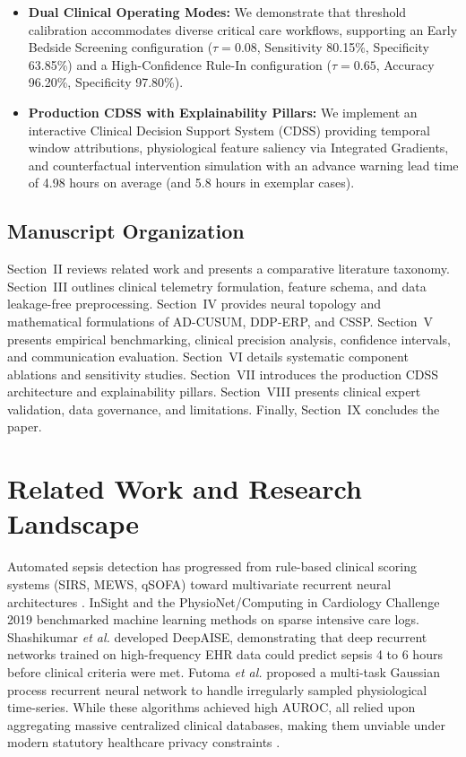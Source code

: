 \documentclass[journal,twocolumn,10pt]{IEEEtran}
\begin{document}
\begin{itemize}
\item \textbf{Dual Clinical Operating Modes:} We demonstrate that threshold calibration accommodates diverse critical care workflows, supporting an Early Bedside Screening configuration ($\tau=0.08$, Sensitivity 80.15\%, Specificity 63.85\%) and a High-Confidence Rule-In configuration ($\tau=0.65$, Accuracy 96.20\%, Specificity 97.80\%).
    \item \textbf{Production CDSS with Explainability Pillars:} We implement an interactive Clinical Decision Support System (CDSS) providing temporal window attributions, physiological feature saliency via Integrated Gradients, and counterfactual intervention simulation with an advance warning lead time of 4.98 hours on average (and 5.8 hours in exemplar cases).
\end{itemize}

\subsection{Manuscript Organization}
Section~II reviews related work and presents a comparative literature taxonomy. Section~III outlines clinical telemetry formulation, feature schema, and data leakage-free preprocessing. Section~IV provides neural topology and mathematical formulations of AD-CUSUM, DDP-ERP, and CSSP. Section~V presents empirical benchmarking, clinical precision analysis, confidence intervals, and communication evaluation. Section~VI details systematic component ablations and sensitivity studies. Section~VII introduces the production CDSS architecture and explainability pillars. Section~VIII presents clinical expert validation, data governance, and limitations. Finally, Section~IX concludes the paper.

\section{Related Work and Research Landscape}
Automated sepsis detection has progressed from rule-based clinical scoring systems (SIRS, MEWS, qSOFA) toward multivariate recurrent neural architectures \cite{singer2016sepsis3,desautels2016prediction}. InSight \cite{desautels2016prediction} and the PhysioNet/Computing in Cardiology Challenge 2019 \cite{reyna2020physionet} benchmarked machine learning methods on sparse intensive care logs. Shashikumar \textit{et al.} \cite{shashikumar2021deepai} developed DeepAISE, demonstrating that deep recurrent networks trained on high-frequency EHR data could predict sepsis 4 to 6 hours before clinical criteria were met. Futoma \textit{et al.} \cite{futoma2017learning} proposed a multi-task Gaussian process recurrent neural network to handle irregularly sampled physiological time-series. While these algorithms achieved high AUROC, all relied upon aggregating massive centralized clinical databases, making them unviable under modern statutory healthcare privacy constraints \cite{kaissis2020trustworthy}.
\end{document}
